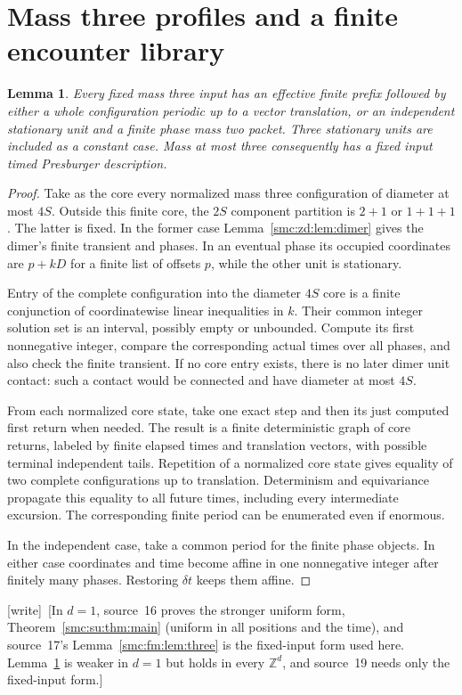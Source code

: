 \documentclass[11pt,letterpaper]{article}
\numberwithin{equation}{section}
\newtheorem{lemma}[theorem]{Lemma}
\theoremstyle{definition}
\theoremstyle{remark}
\newcommand{\Z}{\mathbb Z}
\newcommand{\wtag}{\textup{[write]}}
\begin{document}
\section{Mass three profiles and a finite encounter library}\label{smc:zd:sec:triple}
\begin{lemma}\label{smc:zd:lem:triple}
Every fixed mass three input has an effective finite prefix followed by either a whole configuration periodic up to a vector translation, or an independent stationary unit and a finite phase mass two packet. Three stationary units are included as a constant case. Mass at most three consequently has a fixed input timed Presburger description.
\end{lemma}
\begin{proof}
Take as the core every normalized mass three configuration of diameter at most $4S$. Outside this finite core, the $2S$ component partition is $2+1$ or $1+1+1$. The latter is fixed. In the former case Lemma~\ref{smc:zd:lem:dimer} gives the dimer's finite transient and phases. In an eventual phase its occupied coordinates are $p+kD$ for a finite list of offsets $p$, while the other unit is stationary.

Entry of the complete configuration into the diameter $4S$ core is a finite conjunction of coordinatewise linear inequalities in $k$. Their common integer solution set is an interval, possibly empty or unbounded. Compute its first nonnegative integer, compare the corresponding actual times over all phases, and also check the finite transient. If no core entry exists, there is no later dimer unit contact: such a contact would be connected and have diameter at most $4S$.

From each normalized core state, take one exact step and then its just computed first return when needed. The result is a finite deterministic graph of core returns, labeled by finite elapsed times and translation vectors, with possible terminal independent tails. Repetition of a normalized core state gives equality of two complete configurations up to translation. Determinism and equivariance propagate this equality to all future times, including every intermediate excursion. The corresponding finite period can be enumerated even if enormous.

In the independent case, take a common period for the finite phase objects. In either case coordinates and time become affine in one nonnegative integer after finitely many phases. Restoring $\delta t$ keeps them affine.
\end{proof}
\wtag\ [In $d=1$, source~16 proves the stronger uniform form, Theorem~\ref{smc:su:thm:main} (uniform in all positions and the time), and source~17's Lemma~\ref{smc:fm:lem:three} is the fixed-input form used here. Lemma~\ref{smc:zd:lem:triple} is weaker in $d=1$ but holds in every $\Z^d$, and source~19 needs only the fixed-input form.]
\end{document}
